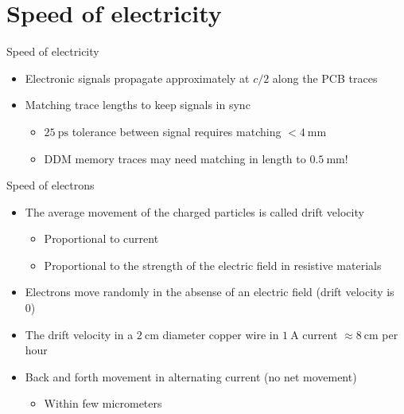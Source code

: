 \documentclass{beamer}
\begin{document}
\section{Speed of electricity}

\begin{frame}{Speed of electricity}
\begin{itemize}
 \item Electronic signals propagate approximately at $c/2$ along the PCB traces~\cite[p. 8--9]{horowitz2020art}
 \item Matching trace lengths to keep signals in sync
 \begin{itemize}
  \item $\SI{25}{\pico\second}$ tolerance between signal requires matching $<\SI{4}{\milli\meter}$
  \item DDM memory traces may need matching in length to $\SI{0.5}{\milli\meter}$!\\
 \end{itemize}
\end{itemize}
\end{frame}

\begin{frame}{Speed of electrons}
\begin{itemize}
 \item The average movement of the charged particles is called drift velocity
 \begin{itemize}
  \item Proportional to current
  \item Proportional to the strength of the electric field in resistive materials
 \end{itemize}
 \item Electrons move randomly in the absense of an electric field (drift velocity is 0)
 \item The drift velocity in a $\SI{2}{\centi\meter}$ diameter copper wire in
       $\SI{1}{\ampere}$ current $\approx\SI{8}{\centi\meter}$ per hour~\cite{wiki:Speed_of_electricity}
 \item Back and forth movement in alternating current (no net movement)
 \begin{itemize}
  \item Within few micrometers
 \end{itemize}
\end{itemize}

\end{frame}
\end{document}
